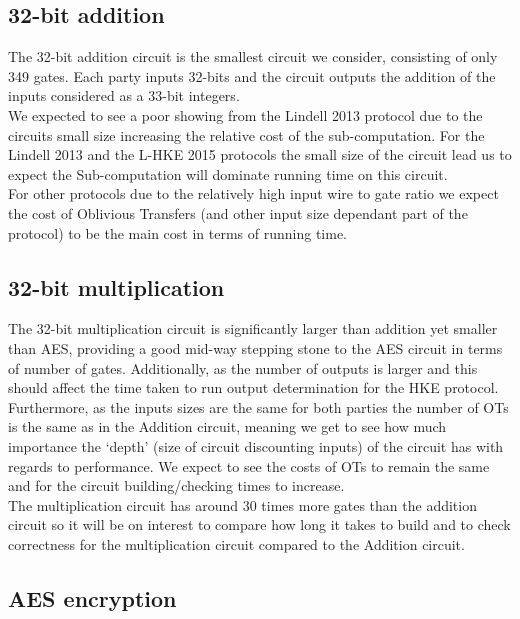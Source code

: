 \documentclass[ %
                    author={Nicholas Tutte},
                supervisor={Prof. Nigel Smart},
                    degree={MEng},
                     title={Secure Two Party Computation},
                  subtitle={A practical comparison of recent protocols},
                      type={Research - GG1K},
                      year={2015} ]{dissertation}
\begin{document}
			\subsection{32-bit addition}
				The 32-bit addition circuit is the smallest circuit we consider, consisting of only 349 gates. Each party inputs 32-bits and the circuit outputs the addition of the inputs considered as a 33-bit integers.\\

				We expected to see a poor showing from the Lindell 2013 protocol due to the circuits small size increasing the relative cost of the sub-computation. For the Lindell 2013 and the L-HKE 2015 protocols the small size of the circuit lead us to expect the Sub-computation will dominate running time on this circuit.\\

				For other protocols due to the relatively high input wire to gate ratio we expect the cost of Oblivious Transfers (and other input size dependant part of the protocol) to be the main cost in terms of running time.

			\subsection{32-bit multiplication}

				The 32-bit multiplication circuit is significantly larger than addition yet smaller than AES, providing a good mid-way stepping stone to the AES circuit in terms of number of gates. Additionally, as the number of outputs is larger and this should affect the time taken to run output determination for the HKE protocol.\\

				Furthermore, as the inputs sizes are the same for both parties the number of OTs is the same as in the Addition circuit, meaning we get to see how much importance the `depth' (size of circuit discounting inputs) of the circuit has with regards to performance. We expect to see the costs of OTs to remain the same and for the circuit building/checking times to increase.\\
				
				The multiplication circuit has around $30$ times more gates than the addition circuit so it will be on interest to compare how long it takes to build and to check correctness for the multiplication circuit compared to the Addition circuit.

			\subsection{AES encryption}
\end{document}
